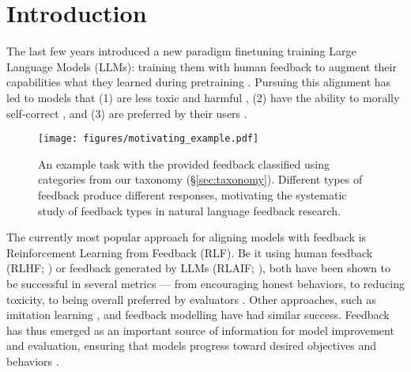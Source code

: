 \section{Introduction}

The last few years introduced a new paradigm finetuning training Large Language Models (LLMs): training them with human feedback \citep{ziegler2020finetuning, stiennon_learning_2022, bai2022training, openai2023gpt4} to augment their capabilities what they learned during pretraining \citep{christiano2017deeprl, wu2021recursively, menick2022teaching}. Pursuing this alignment has led to models that (1) are less toxic and harmful \citep{bai_constitutional_2022, korbak2023pretraining}, (2) have the ability to morally self-correct \citep{ganguli2023capacity}, and (3) are preferred by their users \citep{ouyang_training_2022, bai_constitutional_2022}.


\begin{figure}[ht]
\centering
\texttt{[image: figures/motivating\_example.pdf]}
\caption{An example task with the provided feedback classified using categories from our taxonomy (\S\ref{sec:taxonomy}). Different types of feedback produce different responses, motivating the systematic study of feedback types in natural language feedback research. \vspace{-10pt}}
\label{fig:base_framework}
\end{figure}


The currently most popular approach for aligning models with feedback is Reinforcement Learning from Feedback (RLF). Be it using human feedback (RLHF; \citealp{ouyang_training_2022, bai2022training, ramamurthy2023reinforcement}) or feedback generated by LLMs (RLAIF; \citealp{bai_constitutional_2022, saunders2022selfcritiquing, madaan2023selfrefine}), both have been shown to be successful in several metrics --- from encouraging honest behaviors, to reducing toxicity, to being overall preferred by evaluators \citep{ouyang_training_2022}. Other approaches, such as imitation learning \citep{li2016dialogue, kreutzer-etal-2018-neural, hancock2019learning, scheurer2022training}, and feedback modelling \citep{weston_dialog-based_2016, li_dialogue_2017, hancock2019learning, xu2022learning, liu2023chain} have had similar success. Feedback has thus emerged as an important source of information for model improvement and evaluation, ensuring that models progress toward desired objectives and behaviors \citep{fernandes_bridging_2023}.

